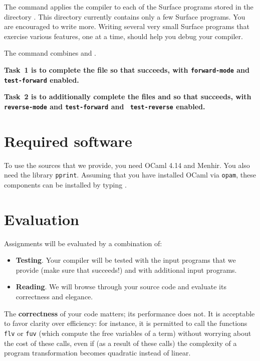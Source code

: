\documentclass{article}
\begin{document}
The command  applies the compiler to each of the Surface
programs stored in the directory . This directory
currently contains only a few Surface programs. You are encouraged to write
more. Writing several very small Surface programs that exercise various
features, one at a time, should help you debug your compiler.

The command  combines  and .

\textbf{Task~1 is to complete the file  so that  succeeds, with \texttt{\dash forward-mode} and \texttt{\dash
    test-forward} enabled.}

\textbf{Task~2 is to additionally complete the files  and
   so that  succeeds, with \texttt{\dash
    reverse-mode} and \texttt{\dash test-forward} and \texttt{\dash
    test-reverse} enabled.}


\section{Required software}

To use the sources that we provide, you need OCaml 4.14 and Menhir.
You also need the library \texttt{pprint}.
Assuming that you have installed OCaml via \texttt{opam},
these components can be installed by typing
.


\section{Evaluation}

Assignments will be evaluated by a combination of:
\begin{itemize}
\item \textbf{Testing}. Your compiler will be tested with the input programs
  that we provide (make sure that  succeeds!) and with
  additional input programs.
\item \textbf{Reading}. We will browse through your source code and evaluate
  its correctness and elegance.
\end{itemize}

The \textbf{correctness} of your code matters;
its performance does not.
It is acceptable to favor clarity over efficiency:
for instance,
it is permitted to call the functions \texttt{flv} or \texttt{fuv}
(which compute the free variables of a term)
without worrying about the cost of these calls,
even if (as a result of these calls)
the complexity of a program transformation becomes
quadratic instead of linear.
\end{document}
